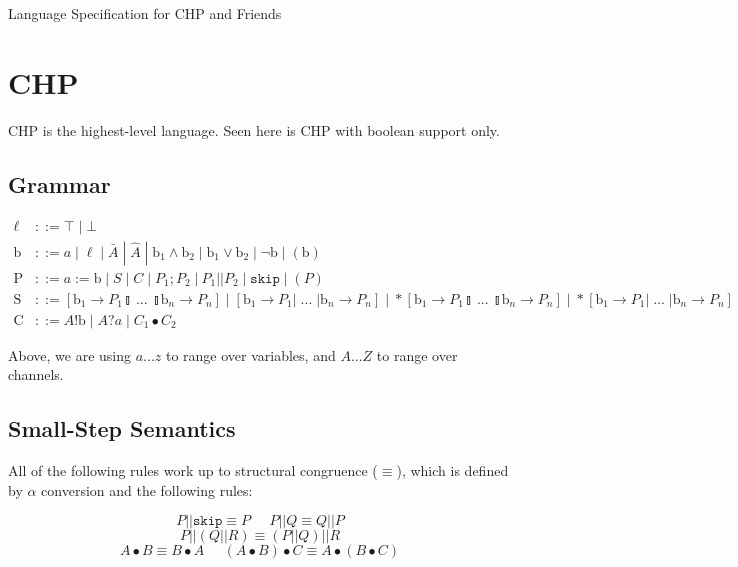 \documentclass[times,10pt]{article}
\begin{document}
\begin{center}
\Large Language Specification for CHP and Friends
\end{center}

\section{CHP}

CHP is the highest-level language.  Seen here is CHP with boolean support only.

\subsection{Grammar}

\begin{align*}
\ell & ::= \top \; | \perp \\
\mathrm{b} & ::= a \; | \; \ell \; | \; \bar{A} \; | \; \widehat{A} \; | \; \mathrm{b}_1 \wedge \mathrm{b}_2 \; | \; \mathrm{b}_1 \vee \mathrm{b}_2 \; | \; \lnot \mathrm{b} \; | \; (\mathrm{b}) \\
\mathrm{P} & ::= a := \mathrm{b} \; | \; S \; | \; C \; | \; P_1; P_2 \; | \: P_1 || P_2 \; | \; \mathtt{skip} \; | \; (P)\\
\mathrm{S} & ::= [ \mathrm{b}_1 \rightarrow P_1  \talloblong \; ... \; \talloblong \mathrm{b}_n \rightarrow P_n ] \; | \; [ \mathrm{b}_1 \rightarrow P_1 | \; ... \; | \mathrm{b}_n \rightarrow P_n ] \; | \; *[ \mathrm{b}_1 \rightarrow P_1  \talloblong \; ... \; \talloblong \mathrm{b}_n \rightarrow P_n ] \; | \; *[ \mathrm{b}_1 \rightarrow P_1 | \; ... \; | \mathrm{b}_n \rightarrow P_n ] \\
\mathrm{C} & ::= A!\mathrm{b} \; | \; A?a \; | \; C_1 \bullet C_2
\end{align*}

Above, we are using $a ... z$ to range over variables, and $A ... Z$ to range over channels.

\subsection{Small-Step Semantics}

All of the following rules work up to structural congruence ($\equiv$), which is defined by $\alpha$ conversion and the following rules:

\[
P || \mathtt{skip} \equiv P \;\;\;\;\;  P || Q \equiv Q || P %
\]
\[
P || (Q || R) \equiv (P || Q) || R 
\]
\[
A \bullet B \equiv B \bullet A \;\;\;\;\; ( A \bullet B ) \bullet C \equiv A \bullet ( B \bullet C )
\]
\end{document}
